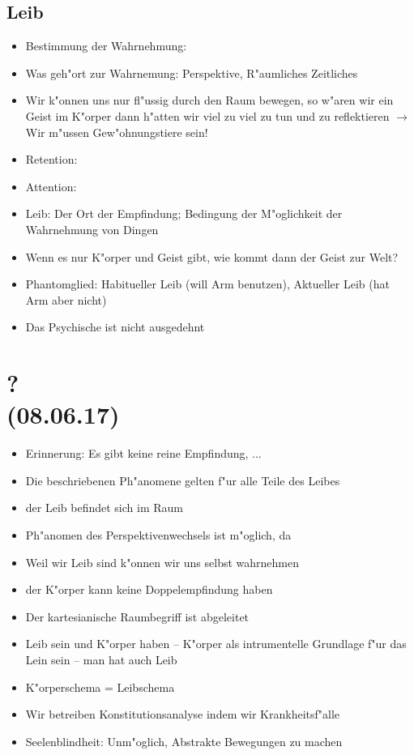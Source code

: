 \documentclass[emulatestandardclasses]{scrartcl}
\begin{document}
\subsection{Leib}

\begin{itemize}
  \item Bestimmung der Wahrnehmung: 
  \item Was geh"ort zur Wahrnemung: Perspektive, R"aumliches Zeitliches
  \item Wir k"onnen uns nur fl"ussig durch den Raum bewegen, so w"aren wir ein Geist im K"orper dann h"atten wir viel zu viel zu tun und zu reflektieren $\rightarrow$ Wir m"ussen Gew"ohnungstiere sein!
  \item Retention: 
  \item Attention:
  \item Leib: Der Ort der Empfindung; Bedingung der M"oglichkeit der Wahrnehmung von Dingen
  \item Wenn es nur K"orper und Geist gibt, wie kommt dann der Geist zur Welt?
  \item Phantomglied: Habitueller Leib (will Arm benutzen), Aktueller Leib (hat Arm aber nicht)
  \item Das Psychische ist nicht ausgedehnt
\end{itemize}

\section{?\\(08.06.17)}

\begin{itemize}
  \item Erinnerung: Es gibt keine reine Empfindung, ...
  \item Die beschriebenen Ph"anomene gelten f"ur alle Teile des Leibes
  \item der Leib befindet sich im Raum
  \item Ph"anomen des Perspektivenwechsels ist m"oglich, da 
  \item Weil wir Leib sind k"onnen wir uns selbst wahrnehmen 
  \item der K"orper kann keine Doppelempfindung haben
  \item Der kartesianische Raumbegriff ist abgeleitet
  \item Leib sein und K"orper haben -- K"orper als intrumentelle Grundlage f"ur das Lein sein -- man hat auch Leib
  \item K"orperschema = Leibschema
  \item Wir betreiben Konstitutionsanalyse indem wir Krankheitsf"alle
  \item Seelenblindheit: Unm"oglich, Abstrakte Bewegungen zu machen
\end{itemize}
\end{document}
